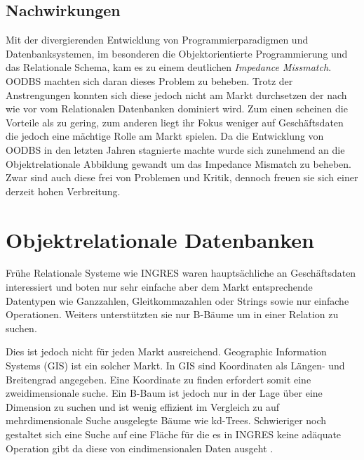 


\subsection{Nachwirkungen}
Mit der divergierenden Entwicklung von Programmierparadigmen und Datenbanksystemen, im besonderen die Objektorientierte Programmierung und das Relationale Schema, kam es zu einem deutlichen \emph{Impedance Missmatch}. 
OODBS machten sich daran dieses Problem zu beheben. Trotz der Anstrengungen konnten sich diese jedoch nicht am Markt durchsetzen der nach wie vor vom Relationalen Datenbanken dominiert wird. Zum einen scheinen die Vorteile als zu gering, zum anderen liegt ihr Fokus weniger auf Geschäftsdaten die jedoch eine mächtige Rolle am Markt spielen.
Da die Entwicklung von OODBS in den letzten Jahren stagnierte machte wurde sich zunehmend an die Objektrelationale Abbildung gewandt um das Impedance Mismatch zu beheben. Zwar sind auch diese frei von Problemen und Kritik, dennoch freuen sie sich einer derzeit hohen Verbreitung.


\section{Objektrelationale Datenbanken}

Frühe Relationale Systeme wie INGRES waren hauptsächliche an Geschäftsdaten interessiert und boten nur sehr einfache aber dem Markt entsprechende Datentypen wie Ganzzahlen, Gleitkommazahlen oder Strings sowie nur einfache Operationen. Weiters unterstützten sie nur B-Bäume um in einer Relation zu suchen.

Dies ist jedoch nicht für jeden Markt ausreichend. Geographic Information Systems (GIS) ist ein solcher Markt. In GIS sind Koordinaten als Längen- und Breitengrad angegeben. Eine Koordinate zu finden erfordert somit eine zweidimensionale suche. Ein B-Baum ist jedoch nur in der Lage über eine Dimension zu suchen und ist wenig effizient im Vergleich zu auf mehrdimensionale Suche ausgelegte Bäume wie kd-Trees. Schwieriger noch gestaltet sich eine Suche auf eine Fläche für die es in INGRES keine adäquate Operation gibt da diese von eindimensionalen Daten ausgeht \cite{stonebraker2005}.

